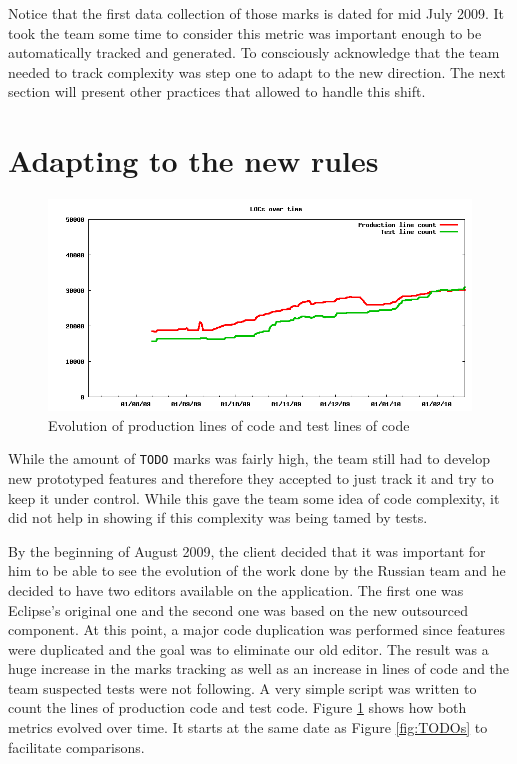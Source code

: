 \documentclass[lnbip]{svmultln}
\begin{document}
Notice that the first data collection of those marks is dated for mid July 2009. It took the team some time to consider this metric was important enough to be automatically tracked and generated. To consciously acknowledge that the team needed to track complexity was step one to adapt to the new direction. The next section will present other practices that allowed to handle this shift.

\section{Adapting to the new rules}
\label{sec:adapting}

\begin{figure}[hbt]
  \centerline{
    \includegraphics[width=120mm]{LOCs.png}
  }
  \caption{Evolution of production lines of code and test lines of
    code}
  \label{fig:LOCs}
\end{figure}

While the amount of \texttt{TODO} marks was fairly high, the team
still had to develop new prototyped features and therefore they
accepted to just track it and try to keep it under control. While this
gave the team some idea of code complexity, it did not help in showing
if this complexity was being tamed by tests.

By the beginning of August 2009, the client decided that it was
important for him to be able to see the evolution of the work done by
the Russian team and he decided to have two editors available on the
application. The first one was Eclipse's original one and the second
one was based on the new outsourced component. At this point, a major
code duplication was performed since features were duplicated and the
goal was to eliminate our old editor. The result was a huge increase
in the marks tracking as well as an increase in lines of code and the
team suspected tests were not following. A very simple script was
written to count the lines of production code and test code. Figure
\ref{fig:LOCs} shows how both metrics evolved over time. It starts at
the same date as Figure \ref{fig:TODOs} to facilitate comparisons.
\end{document}
